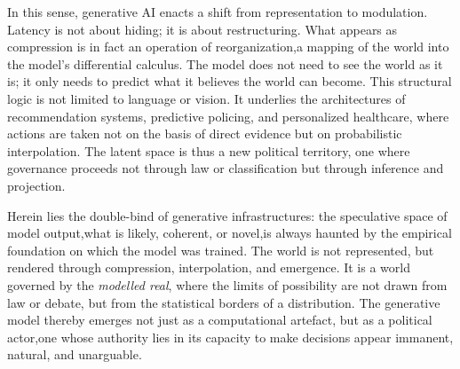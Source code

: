 In this sense, generative AI enacts a shift from representation to modulation. Latency is not about hiding; it is about restructuring. What appears as compression is in fact an operation of reorganization,a mapping of the world into the model’s differential calculus. The model does not need to see the world as it is; it only needs to predict what it believes the world can become. This structural logic is not limited to language or vision. It underlies the architectures of recommendation systems, predictive policing, and personalized healthcare, where actions are taken not on the basis of direct evidence but on probabilistic interpolation. The latent space is thus a new political territory, one where governance proceeds not through law or classification but through inference and projection.

\begin{orangebox}
	Herein lies the double-bind of generative infrastructures: the speculative space of model output,what is likely, coherent, or novel,is always haunted by the empirical foundation on which the model was trained. The world is not represented, but rendered through compression, interpolation, and emergence. It is a world governed by the \textit{modelled real}, where the limits of possibility are not drawn from law or debate, but from the statistical borders of a distribution. The generative model thereby emerges not just as a computational artefact, but as a political actor,one whose authority lies in its capacity to make decisions appear immanent, natural, and unarguable.
\end{orangebox}


